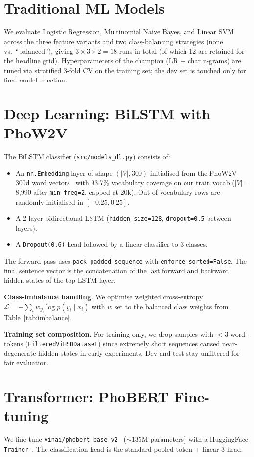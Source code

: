 \documentclass[a4paper,12pt,oneside]{report}
\begin{document}
\section{Traditional ML Models}
\label{sec:method-ml}
We evaluate Logistic Regression, Multinomial Naive Bayes, and Linear SVM
across the three feature variants and two class-balancing strategies
(none vs.\ ``balanced''), giving $3 \times 3 \times 2 = 18$ runs in total
(of which 12 are retained for the headline grid). Hyperparameters of the
champion (LR + char n-grams) are tuned via stratified 3-fold CV on the
training set; the dev set is touched only for final model selection.

\section{Deep Learning: BiLSTM with PhoW2V}
\label{sec:method-bilstm}
The BiLSTM classifier (\texttt{src/models\_dl.py}) consists of:
\begin{itemize}
  \item An \texttt{nn.Embedding} layer of shape $(|V|, 300)$ initialised
        from the PhoW2V 300d word vectors~\cite{nguyen2020phow2v} with
        93.7\% vocabulary coverage on our train vocab ($|V|$ = 8{,}990
        after \texttt{min\_freq=2}, capped at 20k). Out-of-vocabulary
        rows are randomly initialised in $[-0.25, 0.25]$.
  \item A 2-layer bidirectional LSTM (\texttt{hidden\_size=128},
        \texttt{dropout=0.5} between layers).
  \item A \texttt{Dropout(0.6)} head followed by a linear classifier to
        3 classes.
\end{itemize}

The forward pass uses \texttt{pack\_padded\_sequence} with
\texttt{enforce\_sorted=False}. The final sentence vector is the
concatenation of the last forward and backward hidden states of the top
LSTM layer.

\textbf{Class-imbalance handling.} We optimise weighted cross-entropy
$\mathcal{L} = -\sum_i w_{y_i} \log p(y_i \mid x_i)$ with $w$ set to the
balanced class weights from Table~\ref{tab:imbalance}.

\textbf{Training set composition.} For training only, we drop samples
with $<3$ word-tokens (\texttt{FilteredViHSDDataset}) since extremely
short sequences caused near-degenerate hidden states in early
experiments. Dev and test stay unfiltered for fair evaluation.

\section{Transformer: PhoBERT Fine-tuning}
\label{sec:method-phobert}
We fine-tune \texttt{vinai/phobert-base-v2}~\cite{nguyen2020phobert}
($\sim$135M parameters) with a HuggingFace
\texttt{Trainer}~\cite{wolf2020transformers}. The classification head is
the standard pooled-token + linear-3 head.
\end{document}
